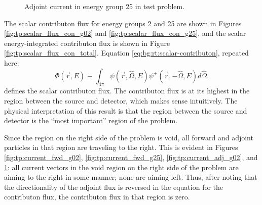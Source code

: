 \begin{figure}
\begin{minipage}{0.45\linewidth}
    \caption{Adjoint current in energy group 25 in test problem.}
    \label{fig:tp:current_adj_g25}
  \end{minipage}
\end{figure}

The scalar contributon flux for energy groups 2 and 25 are shown in Figures \ref{fig:tp:scalar_flux_con_g02} and \ref{fig:tp:scalar_flux_con_g25}, and the scalar energy-integrated contributon flux is shown in Figure \ref{fig:tp:scalar_flux_con_total}.
Equation \ref{eq:bg:rt:scalar-contributon}, repeated here:
\begin{equation*}
  \Phi\left(\vec{r},E\right) \equiv
  \int_{4\pi}\psi\left(\vec{r},\hat{\Omega},E\right)\psi^+\left(\vec{r},-\hat{\Omega},E\right)d\hat{\Omega}.
\end{equation*}
defines the scalar contributon flux.
The contributon flux is at its highest in the region between the source and detector, which makes sense intuitively.
The physical interpretation of this result is that the region between the source and detector is the ``most important'' region of the problem.

Since the region on the right side of the problem is void, all forward and adjoint particles in that region are traveling to the right.
This is evident in Figures \ref{fig:tp:current_fwd_g02}, \ref{fig:tp:current_fwd_g25}, \ref{fig:tp:current_adj_g02}, and \ref{fig:tp:current_adj_g25}: all current vectors in the void region on the right side of the problem are aiming to the right in some manner; none are aiming left.
Thus, after noting that the directionality of the adjoint flux is reversed in the equation for the contributon flux, the contributon flux in that region is zero.

